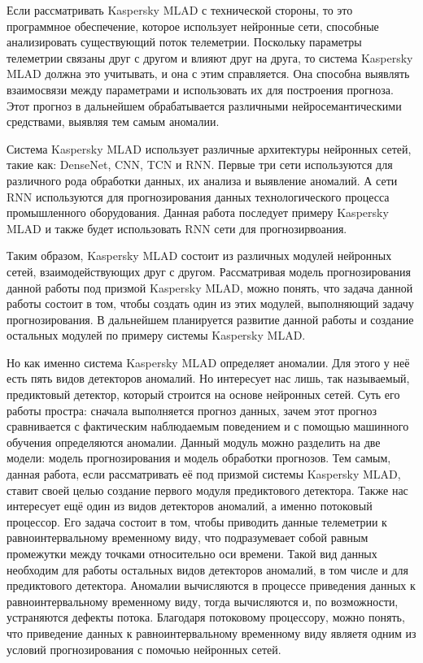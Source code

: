 {  \par \redline Если рассматривать Kaspersky MLAD с технической стороны, то это программное обеспечение, которое использует нейронные сети, способные анализировать существующий поток телеметрии. Поскольку параметры телеметрии связаны друг с другом и влияют друг на друга, то система Kaspersky MLAD должна это учитывать, и она с этим справляется. Она способна выявлять взаимосвязи между параметрами и использовать их для построения прогноза. Этот прогноз в дальнейшем обрабатывается различными нейросемантическими средствами, выявляя тем самым аномалии. 

  \par \redline Система Kaspersky MLAD использует различные архитектуры нейронных сетей, такие как: DenseNet, CNN, TCN и RNN. Первые три сети используются для различного рода обработки данных, их анализа и выявление аномалий. А сети RNN используются для прогнозирования данных технологического процесса промышленного оборудования. Данная работа последует примеру Kaspersky MLAD и также будет использовать RNN сети для прогнозирвоания. 

  \par \redline Таким образом, Kaspersky MLAD состоит из различных модулей нейронных сетей, взаимодействующих друг с другом. Рассматривая модель прогнозирования данной работы под призмой Kaspersky MLAD, можно понять, что задача данной работы состоит в том, чтобы создать один из этих модулей, выполняющий задачу прогнозирования. В дальнейшем планируется развитие данной работы и создание остальных модулей по примеру системы Kaspersky MLAD.

  \par \redline Но как именно система Kaspersky MLAD определяет аномалии. Для этого у неё есть пять видов детекторов аномалий. Но интересует нас лишь, так называемый, предиктовый детектор, который строится на основе нейронных сетей. Суть его работы простра: сначала выполняется прогноз данных, зачем этот прогноз сравнивается с фактическим наблюдаемым поведением и с помощью машинного обучения определяются аномалии. Данный модуль можно разделить на две модели: модель прогнозирования и модель обработки прогнозов. Тем самым, данная работа, если рассматривать её под призмой системы Kaspersky MLAD, ставит своей целью создание первого модуля предиктового детектора. Также нас интересует ещё один из видов детекторов аномалий, а именно потоковый процессор. Его задача состоит в том, чтобы приводить данные телеметрии к равноинтервальному временному виду, что подразумевает собой равным промежутки между точками относительно оси времени. Такой вид данных необходим для работы остальных видов детекторов аномалий, в том числе и для предиктового детектора. Аномалии вычисляются в процессе приведения данных к равноинтервальному временному виду, тогда вычисляются и, по возможности, устраняются дефекты потока. Благодаря потоковому процессору, можно понять, что приведение данных к равноинтервальному временному виду являетя одним из условий прогнозирования с помочью нейронных сетей.

}
